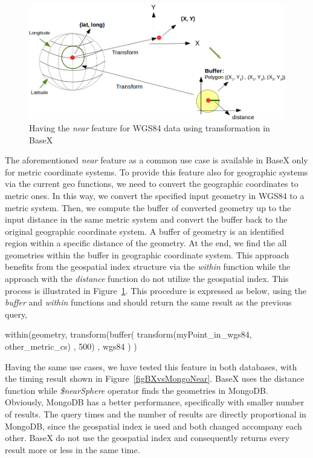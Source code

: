 \documentclass[a4paper,12pt]{article}
\begin{document}
\begin{figure}
\centering
\includegraphics[width=\textwidth]{Transform}
\caption{Having the \textit{near} feature for WGS84 data using transformation in BaseX}
\label{figTransform}
\end{figure}

The aforementioned \textit{near} feature as a common use case is available in BaseX only for metric coordinate systems. To provide this feature also for geographic systems via the current geo functions, we need to convert the geographic coordinates to metric ones. In this way, we convert the specified input geometry in WGS84 to a metric system. Then, we compute the buffer of converted geometry up to the input distance in the same metric system and convert the buffer back to the original geographic coordinate system. A buffer of geometry is an identified region within a specific distance of the geometry. At the end, we find the all geometries within the buffer in geographic coordinate system. This approach benefits from the geospatial index structure via the \textit{within} function while the approach with the \textit{distance} function do not utilize the geospatial index. This process is illustrated in Figure~\ref{figTransform}. 
This procedure is expressed as below, using the \textit{buffer} and \textit{within} functions and should return the same result as the previous query, 

\vspace{10px}
\begin{fakeJSON} 
within(geometry,
       transform(buffer(
                   transform(myPoint_in_wgs84, other_metric_cs)
                   , 500)
                 , wgs84
                )
      )
\end{fakeJSON}
\vspace{10px}
Having the same use cases, we have tested this feature in both databases, with the timing result shown in Figure~\ref{figBXvsMongoNear}. BaseX uses the distance function while \textit{\$nearSphere} operator finds the geometries in MongoDB. Obviously, MongoDB has a better performance, specifically with smaller number of results. The query times and the number of results are directly proportional in MongoDB, since the geospatial index is used and both changed accompany each other. BaseX do not use the geospatial index and consequently returns every result more or less in the same time.
\end{document}
